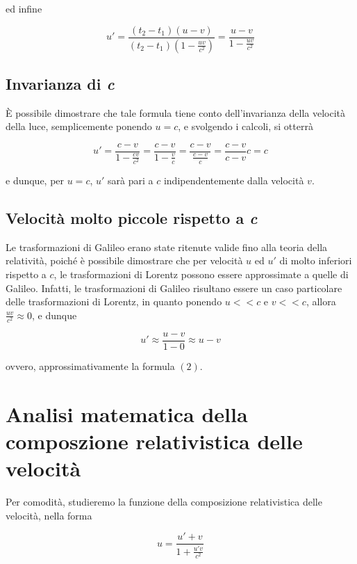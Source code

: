 \documentclass{article}
\begin{document}
ed infine

\begin{equation}
    u' = \frac{(t_2 - t_1)(u - v)}{(t_2 - t_1)\left(1 - \frac{uv}{c^2}\right)} = \frac{u - v}{1 - \frac{uv}{c^2}}
\end{equation}

\subsection{Invarianza di \textit{c}}
\`{E} possibile dimostrare che tale formula tiene conto dell'invarianza della velocità
della luce, semplicemente ponendo \(u = c\), e svolgendo i calcoli, si otterrà

\begin{equation}
    u' = \frac{c - v}{1 - \frac{cv}{c^2}} = \frac{c - v}{1 - \frac{v}{c}} = \frac{c - v}{\frac{c - v}{c}} = \frac{c - v}{c - v}c = c
\end{equation}

e dunque, per \(u = c\), \(u'\) sarà pari a \(c\) indipendentemente dalla velocità \(v\).

\subsection{Velocità molto piccole rispetto a \textit{c}}
Le trasformazioni di Galileo erano state ritenute valide fino alla
teoria della relatività, poiché è possibile dimostrare che per
velocità \(u\) ed \(u'\) di molto inferiori rispetto a \(c\),
le trasformazioni di Lorentz possono essere approssimate a quelle
di Galileo. Infatti, le trasformazioni di Galileo risultano essere un caso
particolare delle trasformazioni di Lorentz, in quanto ponendo
\(u << c\) e \(v << c\), allora \(\frac{uv}{c^2} \approx 0\), e dunque

\begin{equation}
    u' \approx \frac{u - v}{1 - 0} \approx u - v
\end{equation}

ovvero, approssimativamente la formula \((2)\).

\section{Analisi matematica della composzione relativistica delle velocità}
Per comodità, studieremo la funzione della composizione relativistica
delle velocità, nella forma

\begin{equation}
    u = \frac{u' + v}{1 + \frac{u'v}{c^2}}
\end{equation}
\end{document}
